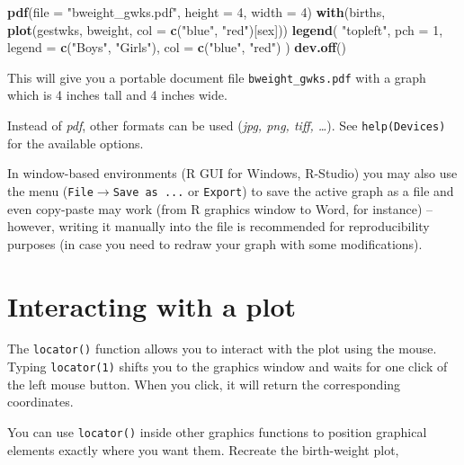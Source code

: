 \documentclass[
]{book}
\newenvironment{Shaded}{\begin{snugshade}}{\end{snugshade}}
\newcommand{\AttributeTok}[1]{\textcolor[rgb]{0.13,0.29,0.53}{#1}}
\newcommand{\DecValTok}[1]{\textcolor[rgb]{0.00,0.00,0.81}{#1}}
\newcommand{\FunctionTok}[1]{\textcolor[rgb]{0.13,0.29,0.53}{\textbf{#1}}}
\newcommand{\NormalTok}[1]{#1}
\newcommand{\StringTok}[1]{\textcolor[rgb]{0.31,0.60,0.02}{#1}}
\theoremstyle{definition}
\theoremstyle{definition}
\theoremstyle{definition}
\theoremstyle{definition}
\theoremstyle{remark}
\begin{document}
\begin{Shaded}
\begin{Highlighting}[]
\FunctionTok{pdf}\NormalTok{(}\AttributeTok{file =} \StringTok{"bweight\_gwks.pdf"}\NormalTok{, }\AttributeTok{height =} \DecValTok{4}\NormalTok{, }\AttributeTok{width =} \DecValTok{4}\NormalTok{)}
\FunctionTok{with}\NormalTok{(births, }\FunctionTok{plot}\NormalTok{(gestwks, bweight, }\AttributeTok{col =} \FunctionTok{c}\NormalTok{(}\StringTok{"blue"}\NormalTok{, }\StringTok{"red"}\NormalTok{)[sex]))}
\FunctionTok{legend}\NormalTok{(}
  \StringTok{"topleft"}\NormalTok{, }
  \AttributeTok{pch =} \DecValTok{1}\NormalTok{, }
  \AttributeTok{legend =} \FunctionTok{c}\NormalTok{(}\StringTok{"Boys"}\NormalTok{, }\StringTok{"Girls"}\NormalTok{), }
  \AttributeTok{col =} \FunctionTok{c}\NormalTok{(}\StringTok{"blue"}\NormalTok{, }\StringTok{"red"}\NormalTok{)}
\NormalTok{)}
\FunctionTok{dev.off}\NormalTok{()}
\end{Highlighting}
\end{Shaded}

This will give you a portable document file \texttt{bweight\_gwks.pdf} with a graph
which is 4 inches tall and 4 inches wide.

Instead of \emph{pdf}, other formats can be used (\emph{jpg, png, tiff, \ldots{}}). See \texttt{help(Devices)} for the available options.

In window-based environments (R GUI for Windows, R-Studio) you may also use the menu
(\texttt{File}\(\rightarrow\)\texttt{Save\ as\ ...} or \texttt{Export}) to save the active graph as a file and even copy-paste may work (from R graphics window to Word, for instance) -- however, writing it manually into the file is recommended for reproducibility purposes (in case you need to redraw your graph with some modifications).

\section{Interacting with a plot}\label{interacting-with-a-plot}

The \texttt{locator()} function allows you to interact with the plot
using the mouse. Typing \texttt{locator(1)} shifts you to the graphics
window and waits for one click of the left mouse button. When you click,
it will return the corresponding coordinates.

You can use \texttt{locator()} inside other graphics functions to position
graphical elements exactly where you want them. Recreate the birth-weight
plot,
\end{document}
